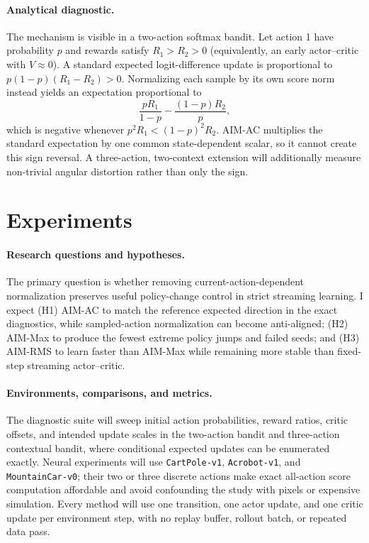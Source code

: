 \documentclass{article}
\begin{document}
\paragraph{Analytical diagnostic.}
The mechanism is visible in a two-action softmax bandit. Let action 1 have probability $p$ and rewards satisfy $R_1>R_2>0$ (equivalently, an early actor--critic with $V\approx0$). A standard expected logit-difference update is proportional to $p(1-p)(R_1-R_2)>0$. Normalizing each sample by its own score norm instead yields an expectation proportional to
\begin{equation}
    \frac{pR_1}{1-p}-\frac{(1-p)R_2}{p},
\end{equation}
which is negative whenever $p^2R_1<(1-p)^2R_2$. AIM-AC multiplies the standard expectation by one common state-dependent scalar, so it cannot create this sign reversal. A three-action, two-context extension will additionally measure non-trivial angular distortion rather than only the sign.

\section{Experiments}
\paragraph{Research questions and hypotheses.}
The primary question is whether removing current-action-dependent normalization preserves useful policy-change control in strict streaming learning. I expect (H1) AIM-AC to match the reference expected direction in the exact diagnostics, while sampled-action normalization can become anti-aligned; (H2) AIM-Max to produce the fewest extreme policy jumps and failed seeds; and (H3) AIM-RMS to learn faster than AIM-Max while remaining more stable than fixed-step streaming actor--critic.

\paragraph{Environments, comparisons, and metrics.}
The diagnostic suite will sweep initial action probabilities, reward ratios, critic offsets, and intended update scales in the two-action bandit and three-action contextual bandit, where conditional expected updates can be enumerated exactly. Neural experiments will use \texttt{CartPole-v1}, \texttt{Acrobot-v1}, and \texttt{MountainCar-v0}; their two or three discrete actions make exact all-action score computation affordable and avoid confounding the study with pixels or expensive simulation. Every method will use one transition, one actor update, and one critic update per environment step, with no replay buffer, rollout batch, or repeated data pass.
\end{document}

